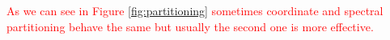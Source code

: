 \documentclass[]{usiinfbachelorproject}
\begin{document}
\textcolor{red}{As we can see in Figure \ref{fig:partitioning} sometimes coordinate and spectral partitioning behave the same but usually the second one is more effective.}
\begin{figure}[ht]
	\centering
\end{figure}
\end{document}
